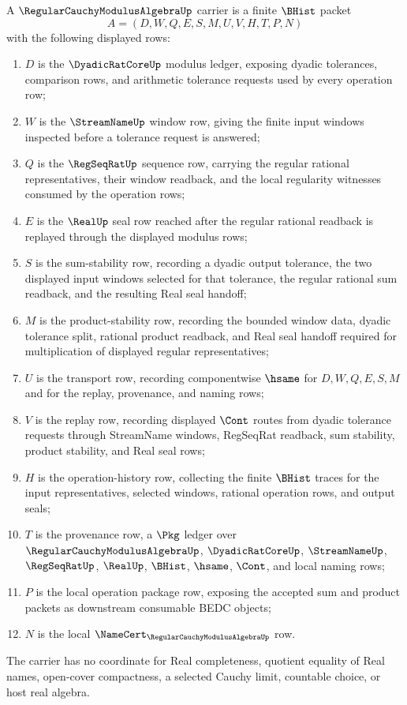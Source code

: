\begin{definition}
\label{def:regular-cauchy-modulus-algebra-carrier}
A $\RegularCauchyModulusAlgebraUp$ carrier is a finite $\BHist$ packet
$$
A=(D,W,Q,E,S,M,U,V,H,T,P,N)
$$
with the following displayed rows:
\begin{enumerate}
\item $D$ is the $\DyadicRatCoreUp$ modulus ledger, exposing dyadic tolerances, comparison rows, and arithmetic tolerance requests used by every operation row;
\item $W$ is the $\StreamNameUp$ window row, giving the finite input windows inspected before a tolerance request is answered;
\item $Q$ is the $\RegSeqRatUp$ sequence row, carrying the regular rational representatives, their window readback, and the local regularity witnesses consumed by the operation rows;
\item $E$ is the $\RealUp$ seal row reached after the regular rational readback is replayed through the displayed modulus rows;
\item $S$ is the sum-stability row, recording a dyadic output tolerance, the two displayed input windows selected for that tolerance, the regular rational sum readback, and the resulting Real seal handoff;
\item $M$ is the product-stability row, recording the bounded window data, dyadic tolerance split, rational product readback, and Real seal handoff required for multiplication of displayed regular representatives;
\item $U$ is the transport row, recording componentwise $\hsame$ for $D,W,Q,E,S,M$ and for the replay, provenance, and naming rows;
\item $V$ is the replay row, recording displayed $\Cont$ routes from dyadic tolerance requests through StreamName windows, RegSeqRat readback, sum stability, product stability, and Real seal rows;
\item $H$ is the operation-history row, collecting the finite $\BHist$ traces for the input representatives, selected windows, rational operation rows, and output seals;
\item $T$ is the provenance row, a $\Pkg$ ledger over $\RegularCauchyModulusAlgebraUp$, $\DyadicRatCoreUp$, $\StreamNameUp$, $\RegSeqRatUp$, $\RealUp$, $\BHist$, $\hsame$, $\Cont$, and local naming rows;
\item $P$ is the local operation package row, exposing the accepted sum and product packets as downstream consumable BEDC objects;
\item $N$ is the local $\NameCert_{\RegularCauchyModulusAlgebraUp}$ row.
\end{enumerate}
The carrier has no coordinate for Real completeness, quotient equality of Real names, open-cover compactness, a selected Cauchy limit, countable choice, or host real algebra.
\end{definition}

